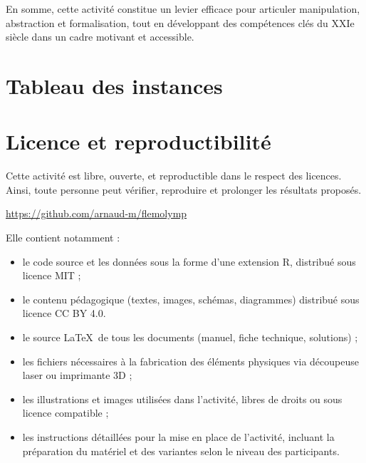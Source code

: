 \documentclass[a4paper,twoside]{article}
\begin{document}
En somme, cette activité constitue un levier efficace pour articuler manipulation, abstraction et formalisation, tout en développant des compétences clés du XXIe siècle dans un cadre motivant et accessible.

\section{Tableau des instances}




\section{Licence et reproductibilité}

Cette activité est libre, ouverte, et reproductible dans le respect des licences.
Ainsi, toute personne peut vérifier, reproduire et prolonger les résultats proposés.

\begin{center}
  \url{https://github.com/arnaud-m/flemolymp}
\end{center}

Elle contient notamment :
\begin{itemize}
\item le code source et les données sous la forme d'une extension R, distribué sous licence MIT ;
\item le contenu pédagogique (textes, images, schémas, diagrammes) distribué sous licence CC BY 4.0.
\item le source \LaTeX\ de tous les documents (manuel, fiche technique, solutions) ;
\item les fichiers nécessaires à la fabrication des éléments physiques via découpeuse laser ou imprimante 3D ;
\item les illustrations et images utilisées dans l'activité, libres de droits ou sous licence compatible ;
\item les instructions détaillées pour la mise en place de l'activité, incluant la préparation du matériel et des variantes selon le niveau des participants.
\end{itemize}


\clearpage
\ifleaflet
  \thispagestyle{empty}
  ~
  \cleardoublepage
\fi


{}




\ifleaflet
  \clearpage
  \thispagestyle{empty}
  ~
  \cleardoublepage
  \thispagestyle{empty}
  ~
\fi
\end{document}
